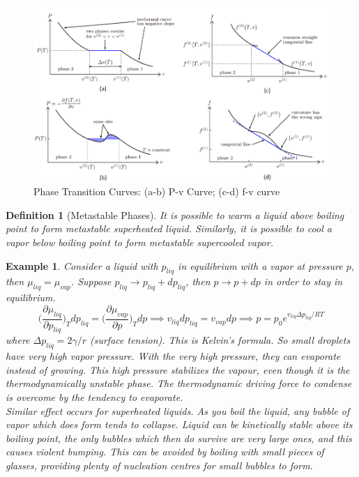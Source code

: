 \documentclass[a4paper]{article}
\newtheorem{eg}{Example}[section]
\theoremstyle{new}
\newtheorem{defi}{Definition}[section]
\begin{document}
\begin{figure}[H]
    \centering
    \includegraphics[width=\linewidth]{phasetransition.PNG}
    \caption{Phase Transition Curves: (a-b) P-v Curve; (c-d) f-v curve}
\end{figure}
\begin{defi}[Metastable Phases]
It is possible to warm a liquid above boiling point to form metastable superheated liquid. Similarly, it is possible to cool a vapor below boiling point to form metastable supercooled vapor.
\end{defi}
\begin{eg}
Consider a liquid with $p_{liq}$ in equilibrium with a vapor at pressure $p$, then $\mu_{liq}=\mu_{vap}$. Suppose $p_{liq}\rightarrow p_{liq}+dp_{liq}$, then $p\rightarrow p+dp$ in order to stay in equilibrium.
$$\bigg(\frac{\partial\mu_{liq}}{\partial p_{liq}}\bigg)_Tdp_{liq}=\bigg(\frac{\partial\mu_{vap}}{\partial p}\bigg)_Tdp\implies v_{liq}dp_{liq}=v_{vap}dp\implies p=p_0e^{v_{liq}\Delta p_{liq}/RT}$$
where $\Delta p_{liq}=2\gamma/r$ (surface tension). This is Kelvin's formula. So small droplets have very high vapor pressure. With the very high pressure, they can evaporate instead of growing. This high pressure stabilizes the vapour, even though it is the thermodynamically unstable phase. The thermodynamic driving force to condense is overcome by the tendency to evaporate.\\[5pt]
Similar effect occurs for superheated liquids. As you boil the liquid, any bubble of vapor which does form tends to collapse. Liquid can be kinetically stable above its boiling point, the only bubbles which then do survive are very large ones, and this causes violent bumping. This can be avoided by boiling with small pieces of glasses, providing plenty of nucleation centres for small bubbles to form. 
\end{eg}
\end{document}
